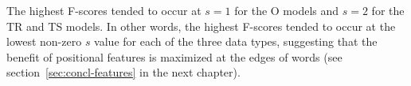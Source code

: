 {%
The highest F-scores tended to occur at $s=1$ for the O models and $s=2$ for the TR and TS models. In other words, the highest F-scores tended to occur at the lowest non-zero $s$ value for each of the three data types, suggesting that the benefit of positional features is maximized at the edges of words (see section~\ref{sec:concl-features} in the next chapter).





}
